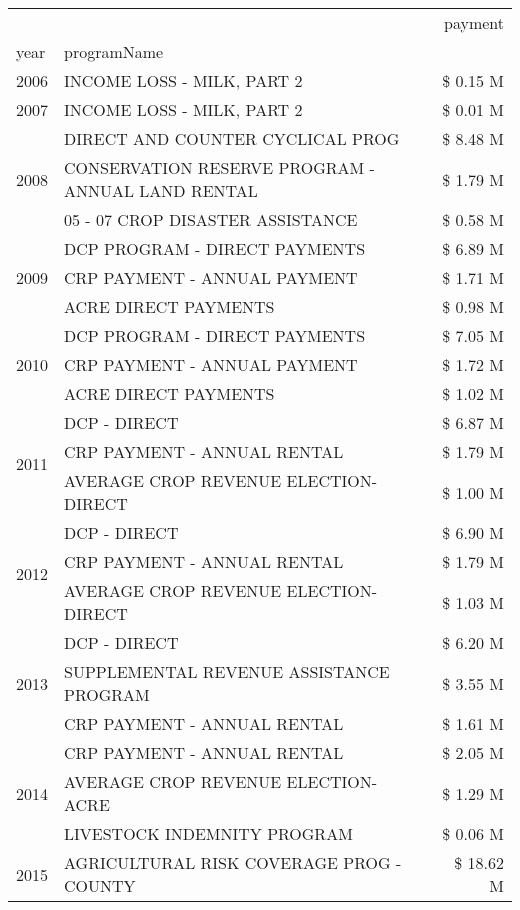 \begin{tabular}{llr}
\toprule
 &  & payment \\
year & programName &  \\
\midrule
2006 & INCOME LOSS - MILK, PART 2 & \$ 0.15 M \\
\cline{1-3}
2007 & INCOME LOSS - MILK, PART 2 & \$ 0.01 M \\
\cline{1-3}
\multirow[t]{3}{*}{2008} & DIRECT AND COUNTER CYCLICAL PROG & \$ 8.48 M \\
 & CONSERVATION RESERVE PROGRAM - ANNUAL LAND RENTAL & \$ 1.79 M \\
 & 05 - 07 CROP DISASTER ASSISTANCE & \$ 0.58 M \\
\cline{1-3}
\multirow[t]{3}{*}{2009} & DCP PROGRAM - DIRECT PAYMENTS & \$ 6.89 M \\
 & CRP PAYMENT - ANNUAL PAYMENT & \$ 1.71 M \\
 & ACRE DIRECT PAYMENTS & \$ 0.98 M \\
\cline{1-3}
\multirow[t]{3}{*}{2010} & DCP PROGRAM - DIRECT PAYMENTS & \$ 7.05 M \\
 & CRP PAYMENT - ANNUAL PAYMENT & \$ 1.72 M \\
 & ACRE DIRECT PAYMENTS & \$ 1.02 M \\
\cline{1-3}
\multirow[t]{3}{*}{2011} & DCP - DIRECT & \$ 6.87 M \\
 & CRP PAYMENT - ANNUAL RENTAL & \$ 1.79 M \\
 & AVERAGE CROP REVENUE ELECTION-DIRECT & \$ 1.00 M \\
\cline{1-3}
\multirow[t]{3}{*}{2012} & DCP - DIRECT & \$ 6.90 M \\
 & CRP PAYMENT - ANNUAL RENTAL & \$ 1.79 M \\
 & AVERAGE CROP REVENUE ELECTION-DIRECT & \$ 1.03 M \\
\cline{1-3}
\multirow[t]{3}{*}{2013} & DCP - DIRECT & \$ 6.20 M \\
 & SUPPLEMENTAL REVENUE ASSISTANCE PROGRAM & \$ 3.55 M \\
 & CRP PAYMENT - ANNUAL RENTAL & \$ 1.61 M \\
\cline{1-3}
\multirow[t]{3}{*}{2014} & CRP PAYMENT - ANNUAL RENTAL & \$ 2.05 M \\
 & AVERAGE CROP REVENUE ELECTION-ACRE & \$ 1.29 M \\
 & LIVESTOCK INDEMNITY PROGRAM & \$ 0.06 M \\
\cline{1-3}
\multirow[t]{3}{*}{2015} & AGRICULTURAL RISK COVERAGE PROG - COUNTY & \$ 18.62 M \\

\end{tabular}
